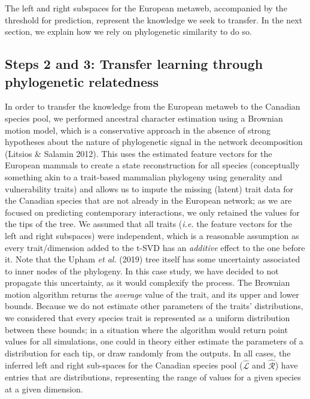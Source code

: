 \documentclass[10pt,oneside]{article}
\begin{document}
The left and right subspaces for the European metaweb, accompanied by
the threshold for prediction, represent the knowledge we seek to
transfer. In the next section, we explain how we rely on phylogenetic
similarity to do so.

\hypertarget{steps-2-and-3-transfer-learning-through-phylogenetic-relatedness}{%
\subsection{Steps 2 and 3: Transfer learning through phylogenetic
relatedness}\label{steps-2-and-3-transfer-learning-through-phylogenetic-relatedness}}

In order to transfer the knowledge from the European metaweb to the
Canadian species pool, we performed ancestral character estimation using
a Brownian motion model, which is a conservative approach in the absence
of strong hypotheses about the nature of phylogenetic signal in the
network decomposition (Litsios \& Salamin 2012). This uses the estimated
feature vectors for the European mammals to create a state
reconstruction for all species (conceptually something akin to a
trait-based mammalian phylogeny using generality and vulnerability
traits) and allows us to impute the missing (latent) trait data for the
Canadian species that are not already in the European network; as we are
focused on predicting contemporary interactions, we only retained the
values for the tips of the tree. We assumed that all traits (\emph{i.e.}
the feature vectors for the left and right subspaces) were independent,
which is a reasonable assumption as every trait/dimension added to the
t-SVD has an \emph{additive} effect to the one before it. Note that the
Upham \emph{et al.} (2019) tree itself has some uncertainty associated
to inner nodes of the phylogeny. In this case study, we have decided to
not propagate this uncertainty, as it would complexify the process. The
Brownian motion algorithm returns the \emph{average} value of the trait,
and its upper and lower bounds. Because we do not estimate other
parameters of the traits' distributions, we considered that every
species trait is represented as a uniform distribution between these
bounds; in a situation where the algorithm would return point values for
all simulations, one could in theory either estimate the parameters of a
distribution for each tip, or draw randomly from the outputs. In all
cases, the inferred left and right sub-spaces for the Canadian species
pool (\(\hat{\mathscr{L}}\) and \(\hat{\mathscr{R}}\)) have entries that
are distributions, representing the range of values for a given species
at a given dimension.
\end{document}
